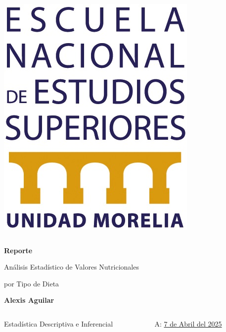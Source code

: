 \documentclass{beamer}
\begin{document}
\begin{frame}[plain]
\begin{columns}[T]
\begin{column}{0.08\textwidth}
                \includegraphics[width=\textwidth]{Resources/logo_enes.jpg}
            \end{column}
        \end{columns}
        \vspace{1.5cm}
        \begin{center}
            {\bfseries Reporte}\par
            {\Large Análisis Estadístico de Valores Nutricionales}\par
            {\Large por Tipo de Dieta}\par
            \vspace{0.5cm}
            {\bfseries Alexis Aguilar}
        \end{center}
        \vspace{1.5cm}
        \begin{columns}[T]
            \begin{column}{0.5\textwidth}
                \raggedright
                {\footnotesize Estadística Descriptiva e Inferencial}
            \end{column}
            \begin{column}{0.5\textwidth}
                \raggedleft
                {\footnotesize A: \underline{7 de Abril del 2025}}
            \end{column}
        \end{columns}
    \end{frame}
\end{document}
